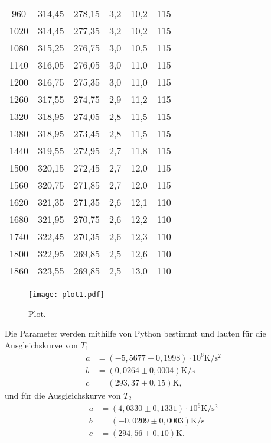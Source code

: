 \begin{table}[H]
\begin{tabular}{S[table-format=4.0] S S S[table-format=1.1] S[table-format=2.1] S[table-format=3.0]}
      960 & 314,45 & 278,15 & 3,2 & 10,2 & 115\\
      1020 & 314,45 & 277,35 & 3,2 & 10,2 & 115\\
      1080 & 315,25 & 276,75 & 3,0 & 10,5 & 115\\
      1140 & 316,05 & 276,05 & 3,0 & 11,0 & 115\\
      1200 & 316,75 & 275,35 & 3,0 & 11,0 & 115\\
      1260 & 317,55 & 274,75 & 2,9 & 11,2 & 115\\
      1320 & 318,95 & 274,05 & 2,8 & 11,5 & 115\\
      1380 & 318,95 & 273,45 & 2,8 & 11,5 & 115\\
      1440 & 319,55 & 272,95 & 2,7 & 11,8 & 115\\
      1500 & 320,15 & 272,45 & 2,7 & 12,0 & 115\\
      1560 & 320,75 & 271,85 & 2,7 & 12,0 & 115\\
      1620 & 321,35 & 271,35 & 2,6 & 12,1 & 110\\
      1680 & 321,95 & 270,75 & 2,6 & 12,2 & 110\\
      1740 & 322,45 & 270,35 & 2,6 & 12,3 & 110\\
      1800 & 322,95 & 269,85 & 2,5 & 12,6 & 110\\
      1860 & 323,55 & 269,85 & 2,5 & 13,0 & 110\\
    \bottomrule
  \end{tabular}
\end{table}	

\begin{figure}
  \centering
  \texttt{[image: plot1.pdf]}
  \caption{Plot.}
  \label{fig:plot1}
\end{figure}


Die Parameter werden mithilfe von Python bestimmt und lauten für die Ausgleichskurve von $T_1$
\begin{align*}
  a&= (-5,5677 \pm 0,1998) \cdot 10^6 \si{\kelvin\per\second\squared}\\
  b&= (0,0264 \pm 0,0004) \si{\kelvin\per\second}\\
  c&= (293,37 \pm 0,15) \si{\kelvin},
\end{align*}
und für die Ausgleichskurve von $T_2$
\begin{align*}
  a&= (4,0330 \pm 0,1331) \cdot 10^6 \si{\kelvin\per\second\squared}\\
  b&= (-0,0209 \pm 0,0003) \si{\kelvin\per\second}\\
  c&= (294,56 \pm 0,10) \si{\kelvin}.
\end{align*}


